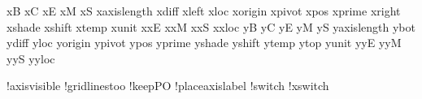 \newdimen\!xB                   %
\newdimen\!xC                   %
\newdimen\!xE                   %
\newdimen\!xM                   %
\newdimen\!xS                   %
\newdimen\!xaxislength          %
\newdimen\!xdiff                %
\newdimen\!xleft                %
\newdimen\!xloc                 %
\newdimen\!xorigin              %
\newdimen\!xpivot               %
\newdimen\!xpos                 %
\newdimen\!xprime               %
\newdimen\!xright               %
\newdimen\!xshade               %
\newdimen\!xshift               %
\newdimen\!xtemp                %
\newdimen\!xunit                %
\newdimen\!xxE                  %
\newdimen\!xxM                  %
\newdimen\!xxS                  %
\newdimen\!xxloc                %
\newdimen\!yB                   %
\newdimen\!yC                   %
\newdimen\!yE                   %
\newdimen\!yM                   %
\newdimen\!yS                   %
\newdimen\!yaxislength          %
\newdimen\!ybot                 %
\newdimen\!ydiff                %
\newdimen\!yloc                 %
\newdimen\!yorigin              %
\newdimen\!ypivot               %
\newdimen\!ypos                 %
\newdimen\!yprime               %
\newdimen\!yshade               %
\newdimen\!yshift               %
\newdimen\!ytemp                %
\newdimen\!ytop                 %
\newdimen\!yunit                %
\newdimen\!yyE                  %
\newdimen\!yyM                  %
\newdimen\!yyS                  %
\newdimen\!yyloc                %

\newif\if!axisvisible           %
\newif\if!gridlinestoo          %
\newif\if!keepPO                %
\newif\if!placeaxislabel        %
\newif\if!switch                %
\newif\if!xswitch               %

